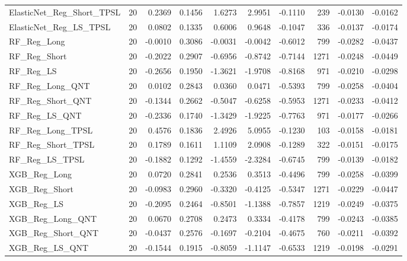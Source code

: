 \begin{tabular}{llrrrrrrrr}
\cline{1-10}
ElasticNet\_Reg\_Short\_TPSL & 20 & 0.2369 & 0.1456 & 1.6273 & 2.9951 & -0.1110 & 239 & -0.0130 & -0.0162 \\
\cline{1-10}
ElasticNet\_Reg\_LS\_TPSL & 20 & 0.0802 & 0.1335 & 0.6006 & 0.9648 & -0.1047 & 336 & -0.0137 & -0.0174 \\
\cline{1-10}
RF\_Reg\_Long & 20 & -0.0010 & 0.3086 & -0.0031 & -0.0042 & -0.6012 & 799 & -0.0282 & -0.0437 \\
\cline{1-10}
RF\_Reg\_Short & 20 & -0.2022 & 0.2907 & -0.6956 & -0.8742 & -0.7144 & 1271 & -0.0248 & -0.0449 \\
\cline{1-10}
RF\_Reg\_LS & 20 & -0.2656 & 0.1950 & -1.3621 & -1.9708 & -0.8168 & 971 & -0.0210 & -0.0298 \\
\cline{1-10}
RF\_Reg\_Long\_QNT & 20 & 0.0102 & 0.2843 & 0.0360 & 0.0471 & -0.5393 & 799 & -0.0258 & -0.0404 \\
\cline{1-10}
RF\_Reg\_Short\_QNT & 20 & -0.1344 & 0.2662 & -0.5047 & -0.6258 & -0.5953 & 1271 & -0.0233 & -0.0412 \\
\cline{1-10}
RF\_Reg\_LS\_QNT & 20 & -0.2336 & 0.1740 & -1.3429 & -1.9225 & -0.7763 & 971 & -0.0177 & -0.0266 \\
\cline{1-10}
RF\_Reg\_Long\_TPSL & 20 & 0.4576 & 0.1836 & 2.4926 & 5.0955 & -0.1230 & 103 & -0.0158 & -0.0181 \\
\cline{1-10}
RF\_Reg\_Short\_TPSL & 20 & 0.1789 & 0.1611 & 1.1109 & 2.0908 & -0.1289 & 322 & -0.0151 & -0.0175 \\
\cline{1-10}
RF\_Reg\_LS\_TPSL & 20 & -0.1882 & 0.1292 & -1.4559 & -2.3284 & -0.6745 & 799 & -0.0139 & -0.0182 \\
\cline{1-10}
XGB\_Reg\_Long & 20 & 0.0720 & 0.2841 & 0.2536 & 0.3513 & -0.4496 & 799 & -0.0258 & -0.0399 \\
\cline{1-10}
XGB\_Reg\_Short & 20 & -0.0983 & 0.2960 & -0.3320 & -0.4125 & -0.5347 & 1271 & -0.0229 & -0.0447 \\
\cline{1-10}
XGB\_Reg\_LS & 20 & -0.2095 & 0.2464 & -0.8501 & -1.1388 & -0.7857 & 1219 & -0.0249 & -0.0375 \\
\cline{1-10}
XGB\_Reg\_Long\_QNT & 20 & 0.0670 & 0.2708 & 0.2473 & 0.3334 & -0.4178 & 799 & -0.0243 & -0.0385 \\
\cline{1-10}
XGB\_Reg\_Short\_QNT & 20 & -0.0437 & 0.2576 & -0.1697 & -0.2104 & -0.4675 & 760 & -0.0211 & -0.0392 \\
\cline{1-10}
XGB\_Reg\_LS\_QNT & 20 & -0.1544 & 0.1915 & -0.8059 & -1.1147 & -0.6533 & 1219 & -0.0198 & -0.0291 \\

\end{tabular}
